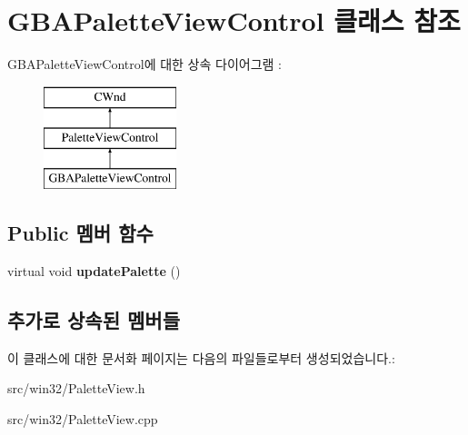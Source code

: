 \hypertarget{class_g_b_a_palette_view_control}{}\section{G\+B\+A\+Palette\+View\+Control 클래스 참조}
\label{class_g_b_a_palette_view_control}
G\+B\+A\+Palette\+View\+Control에 대한 상속 다이어그램 \+: \begin{figure}[H]
\begin{center}
\leavevmode
\includegraphics[height=3.000000cm]{class_g_b_a_palette_view_control}
\end{center}
\end{figure}
\subsection*{Public 멤버 함수}
\begin{DoxyCompactItemize}
\item 
\mbox{\label{class_g_b_a_palette_view_control_a020d7db2f3efb69b4e08d1b5fb351850}} 
virtual void {\bfseries update\+Palette} ()
\end{DoxyCompactItemize}
\subsection*{추가로 상속된 멤버들}


이 클래스에 대한 문서화 페이지는 다음의 파일들로부터 생성되었습니다.\+:\begin{DoxyCompactItemize}
\item 
src/win32/Palette\+View.\+h\item 
src/win32/Palette\+View.\+cpp\end{DoxyCompactItemize}
